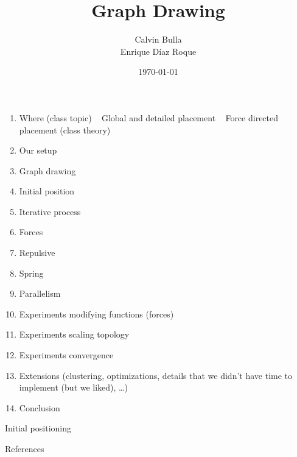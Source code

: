 \documentclass{beamer}
\title{Graph Drawing}
\date{\today}
\author{Calvin Bulla \\ Enrique Díaz Roque}
\institute{Algorithms for VSLI}
\begin{document}
\maketitle

\begin{frame}
\begin {enumerate}
\item Where (class topic) ~ Global and detailed placement ~ Force directed placement (class theory)
\item Our setup
\item Graph drawing
\item Initial position
\item Iterative process
\item Forces
\item Repulsive
\item Spring
\item Parallelism
\item Experiments modifying functions (forces)
\item Experiments scaling topology
\item Experiments convergence
\item Extensions (clustering, optimizations, details that we didn’t have time to implement (but we liked), …)
\item Conclusion
\end{enumerate}
\end{frame}

\begin{frame}{Initial positioning}
\centering
{}

\end{frame}

\nocite{*}

\begin{frame}{References}
  
  
\end{frame}
\end{document}

